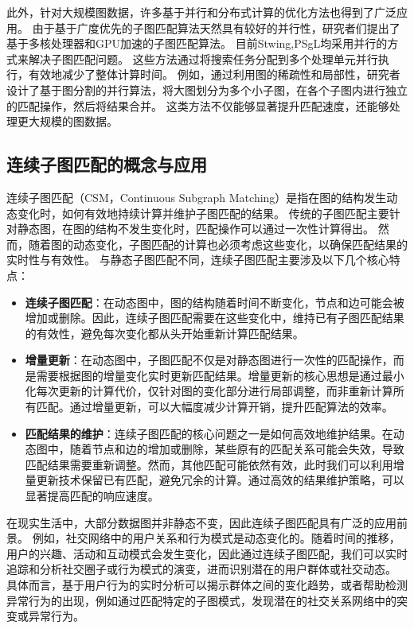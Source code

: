 此外，针对大规模图数据，许多基于并行和分布式计算的优化方法也得到了广泛应用。
由于基于广度优先的子图匹配算法天然具有较好的并行性，研究者们提出了基于多核处理器和GPU加速的子图匹配算法。
目前Stwing\cite{sm-stwing-DBLP:journals/pvldb/SunWWSL12},PSgL\cite{sm-psgl-DBLP:conf/sigmod/ShaoCCMYX14}均采用并行的方式来解决子图匹配问题。
这些方法通过将搜索任务分配到多个处理单元并行执行，有效地减少了整体计算时间。
例如，通过利用图的稀疏性和局部性，研究者设计了基于图分割的并行算法，将大图划分为多个小子图，在各个子图内进行独立的匹配操作，然后将结果合并。
这类方法不仅能够显著提升匹配速度，还能够处理更大规模的图数据。


\subsection{连续子图匹配的概念与应用}
连续子图匹配（CSM，Continuous Subgraph Matching）是指在图的结构发生动态变化时，如何有效地持续计算并维护子图匹配的结果。
传统的子图匹配主要针对静态图，在图的结构不发生变化时，匹配操作可以通过一次性计算得出。
然而，随着图的动态变化，子图匹配的计算也必须考虑这些变化，以确保匹配结果的实时性与有效性。
与静态子图匹配不同，连续子图匹配主要涉及以下几个核心特点：
\begin{itemize}
   \item \textbf{连续子图匹配}：在动态图中，图的结构随着时间不断变化，节点和边可能会被增加或删除。因此，连续子图匹配需要在这些变化中，维持已有子图匹配结果的有效性，避免每次变化都从头开始重新计算匹配结果。
   \item \textbf{增量更新}：在动态图中，子图匹配不仅是对静态图进行一次性的匹配操作，而是需要根据图的增量变化实时更新匹配结果。增量更新的核心思想是通过最小化每次更新的计算代价，仅针对图的变化部分进行局部调整，而非重新计算所有匹配。通过增量更新，可以大幅度减少计算开销，提升匹配算法的效率。
   \item \textbf{匹配结果的维护}：连续子图匹配的核心问题之一是如何高效地维护结果。在动态图中，随着节点和边的增加或删除，某些原有的匹配关系可能会失效，导致匹配结果需要重新调整。然而，其他匹配可能依然有效，此时我们可以利用增量更新技术保留已有匹配，避免冗余的计算。通过高效的结果维护策略，可以显著提高匹配的响应速度。
\end{itemize}

在现实生活中，大部分数据图并非静态不变，因此连续子图匹配具有广泛的应用前景。
例如，社交网络中的用户关系和行为模式是动态变化的。随着时间的推移，用户的兴趣、活动和互动模式会发生变化，因此通过连续子图匹配，我们可以实时追踪和分析社交圈子或行为模式的演变，进而识别潜在的用户群体或社交动态。
具体而言，基于用户行为的实时分析可以揭示群体之间的变化趋势，或者帮助检测异常行为的出现，例如通过匹配特定的子图模式，发现潜在的社交关系网络中的突变或异常行为。

